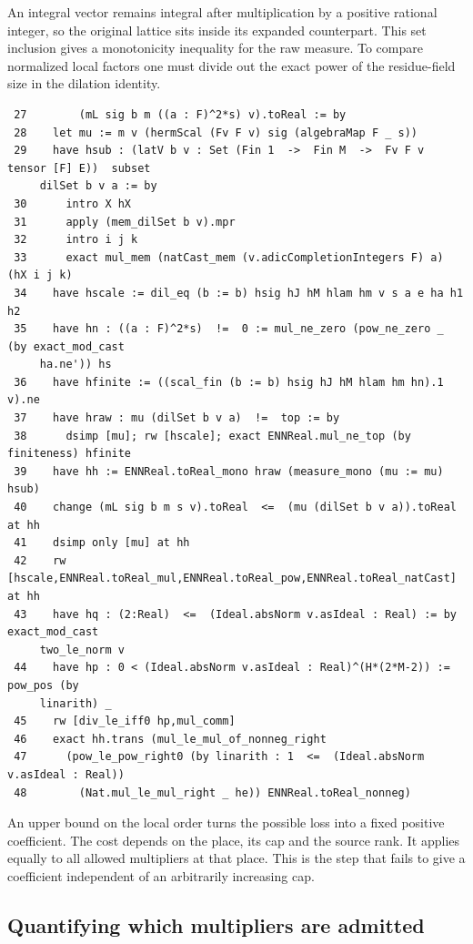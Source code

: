 \documentclass[12pt,letterpaper]{article}
\begin{document}
An integral vector remains integral after multiplication by a positive rational integer, so the original lattice sits inside its expanded counterpart. This set inclusion gives a monotonicity inequality for the raw measure. To compare normalized local factors one must divide out the exact power of the residue-field size in the dilation identity.
\par
{\fontsize{9.2}{11.2}\selectfont\begin{verbatim}
 27        (mL sig b m ((a : F)^2*s) v).toReal := by
 28    let mu := m v (hermScal (Fv F v) sig (algebraMap F _ s))
 29    have hsub : (latV b v : Set (Fin 1  ->  Fin M  ->  Fv F v  tensor [F] E))  subset
     dilSet b v a := by
 30      intro X hX
 31      apply (mem_dilSet b v).mpr
 32      intro i j k
 33      exact mul_mem (natCast_mem (v.adicCompletionIntegers F) a) (hX i j k)
 34    have hscale := dil_eq (b := b) hsig hJ hM hlam hm v s a e ha h1 h2
 35    have hn : ((a : F)^2*s)  !=  0 := mul_ne_zero (pow_ne_zero _ (by exact_mod_cast
     ha.ne')) hs
 36    have hfinite := ((scal_fin (b := b) hsig hJ hM hlam hm hn).1 v).ne
 37    have hraw : mu (dilSet b v a)  !=  top := by
 38      dsimp [mu]; rw [hscale]; exact ENNReal.mul_ne_top (by finiteness) hfinite
 39    have hh := ENNReal.toReal_mono hraw (measure_mono (mu := mu) hsub)
 40    change (mL sig b m s v).toReal  <=  (mu (dilSet b v a)).toReal at hh
 41    dsimp only [mu] at hh
 42    rw [hscale,ENNReal.toReal_mul,ENNReal.toReal_pow,ENNReal.toReal_natCast] at hh
 43    have hq : (2:Real)  <=  (Ideal.absNorm v.asIdeal : Real) := by exact_mod_cast
     two_le_norm v
 44    have hp : 0 < (Ideal.absNorm v.asIdeal : Real)^(H*(2*M-2)) := pow_pos (by
     linarith) _
 45    rw [div_le_iff0 hp,mul_comm]
 46    exact hh.trans (mul_le_mul_of_nonneg_right
 47      (pow_le_pow_right0 (by linarith : 1  <=  (Ideal.absNorm v.asIdeal : Real))
 48        (Nat.mul_le_mul_right _ he)) ENNReal.toReal_nonneg)
\end{verbatim}}
An upper bound on the local order turns the possible loss into a fixed positive coefficient. The cost depends on the place, its cap and the source rank. It applies equally to all allowed multipliers at that place. This is the step that fails to give a coefficient independent of an arbitrarily increasing cap.
\clearpage{}\subsection*{Quantifying which multipliers are admitted}\label{extract-CappedGrowth21}
\end{document}
